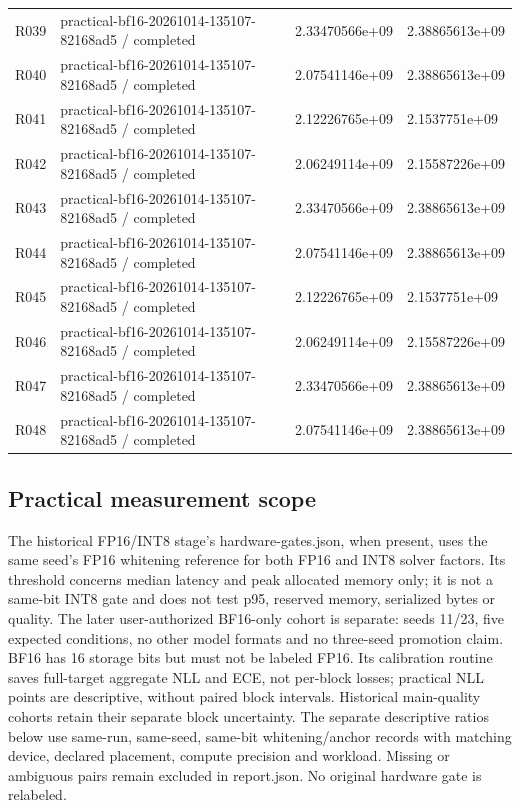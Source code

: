 \documentclass[10pt]{article}
\begin{document}
{\begin{longtable}{p{}p{}p{}p{}}
R039 & practical-bf16-20261014-135107-82168ad5 / completed & 2.33470566e+09 & 2.38865613e+09 \\
R040 & practical-bf16-20261014-135107-82168ad5 / completed & 2.07541146e+09 & 2.38865613e+09 \\
R041 & practical-bf16-20261014-135107-82168ad5 / completed & 2.12226765e+09 & 2.1537751e+09 \\
R042 & practical-bf16-20261014-135107-82168ad5 / completed & 2.06249114e+09 & 2.15587226e+09 \\
R043 & practical-bf16-20261014-135107-82168ad5 / completed & 2.33470566e+09 & 2.38865613e+09 \\
R044 & practical-bf16-20261014-135107-82168ad5 / completed & 2.07541146e+09 & 2.38865613e+09 \\
R045 & practical-bf16-20261014-135107-82168ad5 / completed & 2.12226765e+09 & 2.1537751e+09 \\
R046 & practical-bf16-20261014-135107-82168ad5 / completed & 2.06249114e+09 & 2.15587226e+09 \\
R047 & practical-bf16-20261014-135107-82168ad5 / completed & 2.33470566e+09 & 2.38865613e+09 \\
R048 & practical-bf16-20261014-135107-82168ad5 / completed & 2.07541146e+09 & 2.38865613e+09 \\
\end{longtable}}

\subsection{Practical measurement scope}

The historical FP16/INT8 stage's hardware-gates.json, when present, uses the same seed's FP16 whitening reference for both FP16 and INT8 solver factors. Its threshold concerns median latency and peak allocated memory only; it is not a same-bit INT8 gate and does not test p95, reserved memory, serialized bytes or quality. The later user-authorized BF16-only cohort is separate: seeds 11/23, five expected conditions, no other model formats and no three-seed promotion claim. BF16 has 16 storage bits but must not be labeled FP16. Its calibration routine saves full-target aggregate NLL and ECE, not per-block losses; practical NLL points are descriptive, without paired block intervals. Historical main-quality cohorts retain their separate block uncertainty. The separate descriptive ratios below use same-run, same-seed, same-bit whitening/anchor records with matching device, declared placement, compute precision and workload. Missing or ambiguous pairs remain excluded in report.json. No original hardware gate is relabeled.
\end{document}
